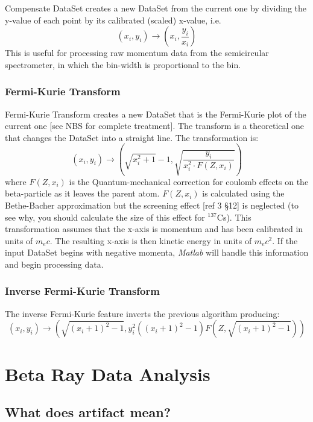 \documentclass{../lab}
\begin{document}
Compensate DataSet creates a new DataSet from the current one by dividing the y-value of each point by its calibrated (scaled) x-value, i.e.
\[
    \left( x_i, y_i \right) \rightarrow \left( x_i, \frac {y_i}{x_i} \right)
\]
This is useful for processing raw momentum data from the semicircular spectrometer, in which the bin-width is proportional to the bin.

\subsubsection{Fermi-Kurie Transform}

Fermi-Kurie Transform creates a new DataSet that is the Fermi-Kurie plot of the current one [see NBS for complete treatment]. The transform is a theoretical one that changes the DataSet into a straight line. The transformation is:
\[
\left(x_{i},y_{i}\right) \rightarrow \left(\sqrt{x_{i}^{2}+1}-1, \sqrt{\frac{y_{i}}{x_{i}^{2} \cdot F\left(Z,x_{i}\right)}}\right)
\]
where $F(Z, x_{i})$ is the Quantum-mechanical correction for coulomb effects on the beta-particle as it leaves the parent atom. $F(Z, x_{i})$ is calculated using the Bethe-Bacher approximation but the screening effect [ref 3 \S12] is neglected (to see why, you should calculate the size of this effect for $^{137}$Cs). This transformation assumes that the x-axis is momentum and has been calibrated in units of $m_e c$. The resulting x-axis is then kinetic energy in units of $m_e c^{2}$. If the input DataSet begins with negative momenta, \emph{Matlab} will handle this information and begin processing data.

\subsubsection{Inverse Fermi-Kurie Transform}

The inverse Fermi-Kurie feature inverts the previous algorithm producing:
\[
(x_i, y_i) \rightarrow \left(\sqrt{(x_i + 1)^2 - 1}, y_i^2 \left( \left(x_i + 1 \right)^2 - 1 \right) F \left(Z, \sqrt{(x_i + 1)^2 - 1} \right) \right)
\]

\section{Beta Ray Data Analysis}

\subsection{What does artifact mean?}
\end{document}
